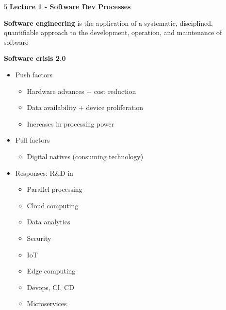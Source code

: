 \documentclass[landscape,a4paper]{extarticle}
\begin{document}
\fontsize{6}{7}\selectfont
{}\selectfont
\begin{multicols*}{5}
    \uline{\textbf{Lecture 1 - Software Dev Processes}}

    \textbf{Software engineering} is the application of a systematic, disciplined, quantifiable approach
    to the development, operation, and maintenance of software

    \textbf{Software crisis 2.0}
    \begin{itemize}
        \item Push factors
        \begin{itemize}
            \item Hardware advances + cost reduction
            \item Data availability + device proliferation
            \item Increases in processing power
        \end{itemize}
        \item Pull factors
        \begin{itemize}
            \item Digital natives (consuming technology)
        \end{itemize}
        \item Responses: R\&D in 
        \begin{itemize}
            \item Parallel processing
            \item Cloud computing
            \item Data analytics
            \item Security
            \item IoT
            \item Edge computing
            \item Devops, CI, CD
            \item Microservices
        \end{itemize}
    \end{itemize}


\end{multicols*}
\end{document}
